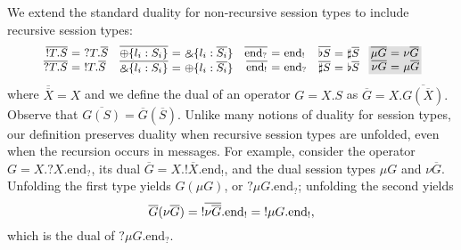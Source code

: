 \documentclass[orivec,envcountsame]{llncs}
\makeatletter
\newcommand{\with}{\mathbin\binampersand}
\newcommand{\gvdual}[1]{\overline{#1}}
\newcommand{\gvout}[2]{{!#1.#2}}
\newcommand{\gvin}[2]{{?#1.#2}}
\newcommand{\outterm}{\mathrm{end}_!}
\newcommand{\interm}{\mathrm{end}_?}
\newcommand{\gvserver}[1]{\flat #1}
\newcommand{\gvservice}[1]{\sharp #1}
\newcommand{\ba}{\begin{array}}
\newcommand{\ea}{\end{array}}
\newenvironment{eqs}{\ba{@{}r@{~}c@{~}l@{}}}{\ea}
\newcommand\shaderow{\noalign{\vskip-0.4pt}\rowcolor{shade}[0.6mm]}
\makeatother
\begin{document}
We extend the standard duality for non-recursive session types to include recursive session types:
\[
\small
\ba{@{}c@{\quad}c@{\quad}c@{\quad}c@{\quad}c@{}}
\begin{eqs}
\gvdual{\gvout{T}{S}} &=& \gvin{T}{\gvdual{S}} \\
\gvdual{\gvin{T}{S}} &=& \gvout{T}{\gvdual{S}} \\
\end{eqs}
&
\begin{eqs}
  \gvdual{\oplus \{ l_i: S_i \}} &=& \with \{ l_i : \gvdual{S_i} \} \\
  \gvdual{\with \{ l_i: S_i \}} &=& \oplus \{ l_i : \gvdual{S_i} \} \\
\end{eqs}
&
\begin{eqs}
  \gvdual{\interm} &=& \outterm \\
  \gvdual{\outterm} &=& \interm \\
\end{eqs}
&
\begin{eqs}
  \gvdual{\gvserver{S}} &=& \gvservice{\gvdual{S}} \\
  \gvdual{\gvservice{S}} &=& \gvserver{\gvdual{S}} \\
\end{eqs}
&
\begin{eqs}
  \shaderow \gvdual{\mu G} &=& \nu \gvdual{G} \\
  \shaderow \gvdual{\nu G} &=& \mu \gvdual{G}
\end{eqs}
\ea
\]
where $\gvdual{\gvdual{X}} = X$ and we define the dual of an operator $G = X.S$ as $\gvdual{G} =
X.\gvdual{G(\gvdual{X})}.$ Observe that $\gvdual{G(S)} = \gvdual{G}(\gvdual{S})$.  Unlike many
notions of duality for session types, our definition preserves duality when recursive session types
are unfolded, even when the recursion occurs in messages.  For example, consider the operator $G =
X.\gvin{X}{\interm}$, its dual $\gvdual{G} = X.\gvout{\gvdual{X}}{\outterm}$, and the dual session
types $\mu G$ and $\nu \gvdual{G}$.  Unfolding the first type yields $G(\mu G)$, or $\gvin{\mu
  G}{\interm}$; unfolding the second yields
\[
\small
  \gvdual{G}(\nu \gvdual{G}) = \gvout{\gvdual{\nu \gvdual{G}}}{\outterm} = \gvout{\mu G}{\outterm},
\]
which is the dual of $\gvin{\mu G}{\interm}$.
\end{document}
